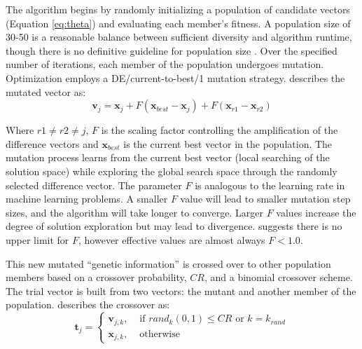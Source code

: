 The algorithm begins by randomly initializing a population of candidate vectors (Equation \ref{eq:theta}) and evaluating each member's fitness. A population size of 30-50 is a reasonable balance between sufficient diversity and algorithm runtime, though there is no definitive guideline for population size \citep{piotrowski2017review,balkaya20173d}. Over the specified number of iterations, each member of the population undergoes mutation. Optimization employs a DE/current-to-best/1 mutation strategy. \cite{georgioudakis2020comparative} describes the mutated vector as:
\begin{equation}
    \mathbf{v}_{j} = \mathbf{x}_{j} + F(\mathbf{x}_{best}-\mathbf{x}_{j}) + F(\mathbf{x}_{r1} - \mathbf{x}_{r2})
    \label{eq:mutation}
\end{equation}

Where $r1 \neq r2 \neq j$, $F$ is the scaling factor controlling the amplification of the difference vectors and $\mathbf{x}_{best}$ is the current best vector in the population. The mutation process learns from the current best vector (local searching of the solution space) while exploring the global search space through the randomly selected difference vector. The parameter $F$ is analogous to the learning rate in machine learning problems. A smaller $F$ value will lead to smaller mutation step sizes, and the algorithm will take longer to converge. Larger $F$ values increase the degree of solution exploration but may lead to divergence. \cite{price2013differential} suggests there is no upper limit for $F$, however effective values are almost always $F < 1.0$.

This new mutated ``genetic information'' is crossed over to other population members based on a crossover probability, $CR$, and a binomial crossover scheme. The trial vector is built from two vectors: the mutant and another member of the population. \cite{price2013differential} describes the crossover as:
\begin{equation}
    \mathbf{t}_{j} =
    \begin{cases}
        \mathbf{v}_{j, k}, & \text{ if }rand_{k}(0,1) \leq CR \text{ or } k=k_{rand} \\
        \mathbf{x}_{j, k}, & \text{ otherwise }
    \end{cases}
    \label{eq:crossover}
\end{equation}

